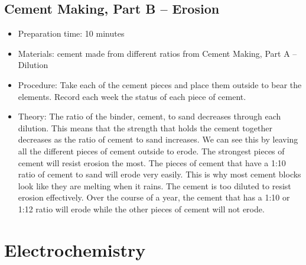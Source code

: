\subsection{Cement Making, Part B -- Erosion}
\begin{itemize}
\item{Preparation time: 10 minutes}
\item{Materials: cement made from different ratios from Cement Making, Part A -- Dilution}
\item{Procedure: Take each of the cement pieces and place them outside to bear the elements. Record each week the status of each piece of cement.}
\item{Theory: The ratio of the binder, cement, to sand decreases through each dilution. This means that the strength that holds the cement together decreases as the ratio of cement to sand increases. We can see this by leaving all the different pieces of cement outside to erode. The strongest pieces of cement will resist erosion the most. The pieces of cement that have a 1:10 ratio of cement to sand will erode very easily. This is why most cement blocks look like they are melting when it rains. The cement is too diluted to resist erosion effectively. Over the course of a year, the cement that has a 1:10 or 1:12 ratio will erode while the other pieces of cement will not erode.}
\end{itemize}

\section{Electrochemistry}


